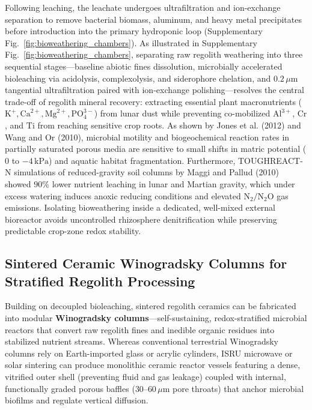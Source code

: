 Following leaching, the leachate undergoes ultrafiltration and ion-exchange separation to remove bacterial biomass, aluminum, and heavy metal precipitates before introduction into the primary hydroponic loop (Supplementary Fig.~\ref{fig:bioweathering_chambers})\cite{ming1989lunar,santomartino2024ecomine}. As illustrated in Supplementary Fig.~\ref{fig:bioweathering_chambers}, separating raw regolith weathering into three sequential stages---baseline abiotic fines dissolution, microbially accelerated bioleaching via acidolysis, complexolysis, and siderophore chelation\cite{cockell2018biorock,cockell2020microbially}, and $0.2\,\mu\mathrm{m}$ tangential ultrafiltration paired with ion-exchange polishing---resolves the central trade-off of regolith mineral recovery: extracting essential plant macronutrients ($\mathrm{K}^+, \mathrm{Ca}^{2+}, \mathrm{Mg}^{2+}, \mathrm{PO}_4^{3-}$) from lunar dust while preventing co-mobilized $\mathrm{Al}^{3+}$, $\mathrm{Cr}$, and $\mathrm{Ti}$ from reaching sensitive crop roots\cite{paul2022plants,ming1989lunar}. As shown by Jones et al. (2012) and Wang and Or (2010), microbial motility and biogeochemical reaction rates in partially saturated porous media are sensitive to small shifts in matric potential ($0$ to $-4\,\mathrm{kPa}$) and aquatic habitat fragmentation\cite{jones2012beyond,wang2010aqueous,skopp1990steady}. Furthermore, TOUGHREACT-N simulations of reduced-gravity soil columns by Maggi and Pallud (2010) showed $90\%$ lower nutrient leaching in lunar and Martian gravity, which under excess watering induces anoxic reducing conditions and elevated $\mathrm{N}_2/\mathrm{N}_2\mathrm{O}$ gas emissions\cite{maggi2010space,maggi2010martian,jones2012beyond}. Isolating bioweathering inside a dedicated, well-mixed external bioreactor avoids uncontrolled rhizosphere denitrification while preserving predictable crop-zone redox stability.

\subsection{Sintered Ceramic Winogradsky Columns for Stratified Regolith Processing}
\label{subsec:winogradsky_columns}

Building on decoupled bioleaching, sintered regolith ceramics can be fabricated into modular \textbf{Winogradsky columns}---self-sustaining, redox-stratified microbial reactors that convert raw regolith fines and inedible organic residues into stabilized nutrient streams\cite{ming1989lunar,santomartino2024ecomine,liu2020bioregenerative}. Whereas conventional terrestrial Winogradsky columns rely on Earth-imported glass or acrylic cylinders, ISRU microwave or solar sintering can produce monolithic ceramic reactor vessels featuring a dense, vitrified outer shell (preventing fluid and gas leakage) coupled with internal, functionally graded porous baffles ($30\text{--}60\,\mu\mathrm{m}$ pore throats) that anchor microbial biofilms and regulate vertical diffusion\cite{ming1989lunar,xi2026multiphysics}.

